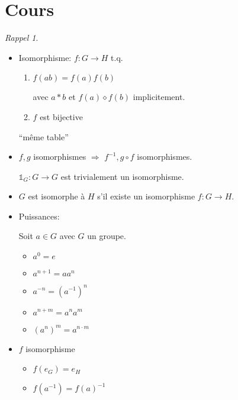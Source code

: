\documentclass{report}
\newcounter{cours}
\newcommand*{\cours}{\section*{Cours \thecours}\stepcounter{cours}}
\theoremstyle{definition}
\theoremstyle{remark}
\newtheorem*{rappel}{Rappel}
\begin{document}
	\cours
	\begin{rappel}
		~

		\begin{itemize}
			\item Isomorphisme: $f:G \to H$ t.q.
			\begin{enumerate}[label=(\arabic*)]
				\item $f(ab)=f(a)f(b)$

				avec $a *b$ et $f(a) \diamond f(b)$ implicitement.
				\item $f$ est bijective
			\end{enumerate}
			``m\^eme table''
			\item $f,g$ isomorphismes $\Rightarrow$ $f^{-1}, g \circ f$ isomorphismes.

			$\mathds{1}_G:G \to G$ est trivialement un isomorphisme.
			\item $G$ est isomorphe \`a $H$ s'il existe un isomorphisme $f:G \to H$.
			\item Puissances:

			Soit $a \in G$ avec $G$ un groupe.
			\begin{itemize}
				\item $a^0=e$
				\item $a^{n+1}=aa^n$
				\item $a^{-n}=(a^{-1})^n$
				\item $a^{n+m}=a^na^m$
				\item $(a^n)^m=a^{n \cdot m}$
			\end{itemize}
			\item $f$ isomorphisme
			\begin{itemize}
				\item $f(e_G)=e_H$
				\item $f(a^{-1})=f(a)^{-1}$
			\end{itemize}
		\end{itemize}
	\end{rappel}
\end{document}
